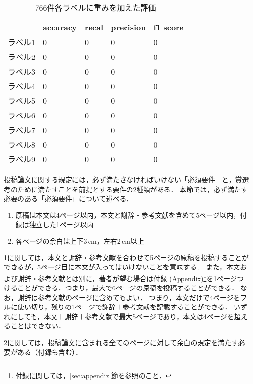 \documentclass[
  platex, dvipdfmx,  %
]{nlp2024}
\begin{document}
\begin{table}[H]
  \caption{766件各ラベルに重みを加えた評価}
  \label{table4}
  \centering
  \begin{tabular}{|l|l|l|l|l|}
    \hline
    & accuracy & recal & precision & f1 score \\
    \hline
    ラベル1   & 0  & 0       & 0         & 0\\
    \hline
    ラベル2  & 0  & 0       & 0         & 0\\
    \hline
    ラベル3   & 0  & 0       & 0         & 0\\
    \hline
    ラベル4  & 0  & 0       & 0         & 0\\
    \hline
    ラベル5   & 0  & 0       & 0         & 0\\
    \hline
    ラベル6   & 0  & 0       & 0         & 0\\
    \hline
    ラベル7   & 0  & 0       & 0         & 0\\
    \hline
    ラベル8   & 0  & 0       & 0         & 0\\
    \hline
    ラベル9   & 0  & 0       & 0         & 0\\
    \hline
    \end{tabular}
\end{table}

投稿論文に関する規定には，必ず満たさなければいけない「必須要件」と，賞選考のために満たすことを前提とする要件の2種類がある．
本節では，必ず満たす必要のある「必須要件」について述べる．

\begin{enumerate}
\item 原稿は本文は4ページ以内，本文と謝辞・参考文献を含めて5ページ以内，付録は独立した1ページ以内
\item 各ページの余白は上下3\,cm，左右2\,cm以上
\end{enumerate}

1に関しては，本文と謝辞・参考文献を合わせて5ページの原稿を投稿することができるが，5ページ目に本文が入ってはいけないことを意味する．
また，本文および謝辞・参考文献とは別に，著者が望む場合は付録 (Appendix)\footnote{付録に関しては，\ref{sec:appendix}節を参照のこと．}を1ページつけることができる．つまり，最大で6ページの原稿を投稿することができる．
なお，謝辞は参考文献のページに含めてもよい．
つまり，本文だけで4ページをフルに使い切り，残りの1ページで謝辞＋参考文献を記載することができる．
いずれにしても，本文＋謝辞＋参考文献で最大5ページであり，本文は4ページを超えることはできない．


2に関しては，投稿論文に含まれる全てのページに対して余白の規定を満たす必要がある（付録も含む）．
\end{document}
